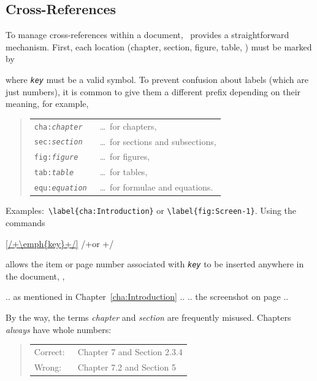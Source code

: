 \subsection{Cross-References}
\label{sec:cross-references}

To manage cross-references within a document, \latex\ provides a straightforward
mechanism. First, each location (chapter, section, figure, table, \etc) must be
marked by
%
\begin{LaTeXCode}[numbers=none]
\label{/+\emph{key}+/}
\end{LaTeXCode}
%
where \texttt{\em key} must be a valid \latex symbol.
To prevent confusion about labels (which are just numbers), it is common to give
them a different prefix depending on their meaning, for example,
%
\begin{quote}
    \begin{tabular}{ll}
        \verb!cha:!\texttt{\em chapter} & \ \ldots\ for chapters, \\
        \verb!sec:!\texttt{\em section} & \ \ldots\ for sections and
        subsections, \\
        \verb!fig:!\texttt{\em figure} & \ \ldots\ for figures, \\
        \verb!tab:!\texttt{\em table} & \ \ldots\ for tables, \\
        \verb!equ:!\texttt{\em equation} & \ \ldots\ for formulae and equations.
    \end{tabular}
\end{quote}
%
\noindent
Examples:\ \verb!\label{cha:Introduction}! or \verb!\label{fig:Screen-1}!.
Using the commands
%
\begin{LaTeXCode}[numbers=none]
\ref{/+\emph{key}+/} /+\quad or \quad+/ 
\end{LaTeXCode}
%
allows the item or page number associated with \texttt{\emph{key}} to be
inserted anywhere in the document, \eg,
%
\begin{LaTeXCode}[numbers=none]
.. as mentioned in Chapter~\ref{cha:Introduction} ..
.. the screenshot on page \pageref{fig:Screen-1} ..
\end{LaTeXCode}
%
By the way, the terms \emph{chapter} and \emph{section} are frequently misused.
Chapters \emph{always} have whole numbers:
%
\begin{quote}
    \begin{tabular}{ll}
        \textrm{Correct:\ } & Chapter 7 and Section 2.3.4 \\
        \textrm{Wrong:\ } & Chapter 7.2 and Section 5
    \end{tabular}
\end{quote}
